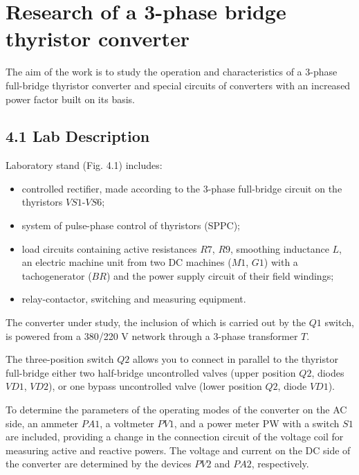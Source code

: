 \documentclass[a4paper,14pt]{article}
\begin{document}
\section{Research of a 3-phase bridge thyristor converter}

The aim of the work is to study the operation and characteristics of a 3-phase full-bridge thyristor converter and special circuits of converters with an increased power factor built on its basis.

\subsection{4.1 Lab Description}

Laboratory stand (Fig. 4.1) includes:

\begin{itemize}
\item controlled rectifier, made according to the 3-phase full-bridge circuit on the thyristors $VS1$-$VS6$;

\item system of pulse-phase control of thyristors (SPPC);

\item load circuits containing active resistances $R7$, $R9$, smoothing inductance $L$, an electric machine unit from two DC machines ($M1$, $G1$) with a tachogenerator ($BR$) and the power supply circuit of their field windings;

\item relay-contactor, switching and measuring equipment.
\end{itemize}

The converter under study, the inclusion of which is carried out by the $Q1$ switch, is powered from a 380/220 V network through a 3-phase transformer $T$.

The three-position switch $Q2$ allows you to connect in parallel to the thyristor full-bridge either two half-bridge uncontrolled valves (upper position $Q2$, diodes $VD1$, $VD2$), or one bypass uncontrolled valve (lower position $Q2$, diode $VD1$).

To determine the parameters of the operating modes of the converter on the AC side, an ammeter $PA1$, a voltmeter $PV1$, and a power meter PW with a switch $S1$ are included, providing a change in the connection circuit of the voltage coil for measuring active and reactive powers. The voltage and current on the DC side of the converter are determined by the devices $PV2$ and $PA2$, respectively.
\end{document}
